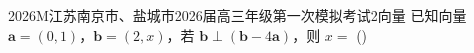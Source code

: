 
\begin{problem}{2026}{M}{江苏南京市、盐城市2026届高三年级第一次模拟考试}{2}{向量}
已知向量 $\boldsymbol{a}=(0,1)$，$\boldsymbol{b}=(2,x)$，若 $\boldsymbol{b}\perp(\boldsymbol{b}-4\boldsymbol{a})$，则 $x=$
(\hspace{1cm})
\begin{choices}
\end{choices}
\end{problem}